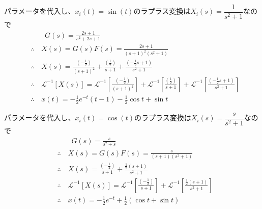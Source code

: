\documentclass[a4paper,12pt]{article}
\begin{document}
\begin{tcolorbox}[title={7.(8)\quad \( m=1,d=2,k=1\)とし、入力\(x_i(t)=\sin (t)\) を印加したときの応答を求めよ。
    }]
    パラメータを代入し、\(x_i(t)=\sin(t)\)のラプラス変換は\(X_i(s)=\dfrac{1}{s^2+1}\)なので
    \vspace{-4mm}
    \begin{align*}
        &\qquad G(s) = \frac{2s+1}{s^2 + 2s+ 1} \\
        &\therefore \quad X(s) = G(s) F(s) = \frac{2s+1}{(s+1)^2(s^2+1)} \\
        &\therefore \quad X(s) =  \frac{\left(-\frac{1}{2}\right)}{(s+1)^2} 
        + \frac{\left(\frac{1}{2}\right)}{s+1}
        + \frac{\left(-\frac{1}{2}s+1\right)}{s^2+1}\\
        &\therefore \quad \mathcal{L}^{-1} \left[ X(s)\right] 
        = \mathcal{L}^{-1} \left[\frac{\left(-\frac{1}{2}\right)}{(s+1)^2} \right]
        + \mathcal{L}^{-1} \left[\frac{\left(\frac{1}{2}\right)}{s+1} \right]
        + \mathcal{L}^{-1} \left[\frac{\left(-\frac{1}{2}s+1\right)}{s^2+1}\right]  \\
        &\therefore \quad x(t) = -\frac{1}{2}e^{-t}(t-1)-\frac{1}{2} \cos t + \sin t
    \end{align*}
\end{tcolorbox}
\begin{tcolorbox}[title={7.(9)\quad \( m=1,d=1,k=0\)とし、入力\(x_1(t)=\cos (t)\) を印加したときの応答を求めよ。
    }]
    パラメータを代入し、\(x_i(t)=\cos(t)\)のラプラス変換は\(X_i(s)=\dfrac{s}{s^2+1}\)なので
    \vspace{-2mm}
    \begin{align*}
        &\qquad G(s) = \frac{s}{s^2 + s} \\
        &\therefore \quad X(s) = G(s) F(s) = \frac{s}{(s+1)(s^2+1)} \\
        &\therefore \quad X(s) =  \frac{\left(-\frac{1}{2}\right)}{s+1}
        + \frac{\frac{1}{2}\left(s+1\right)}{s^2+1}\\
        &\therefore \quad \mathcal{L}^{-1} \left[ X(s)\right] 
        = \mathcal{L}^{-1} \left[\frac{\left(-\frac{1}{2}\right)}{s+1} \right]
        + \mathcal{L}^{-1} \left[\frac{\frac{1}{2}\left(s+1\right)}{s^2+1} \right] \\
        &\therefore \quad x(t) = -\frac{1}{2}e^{-t} + \frac{1}{2}(\cos t + \sin t)
    \end{align*}
\end{tcolorbox}
\end{document}
